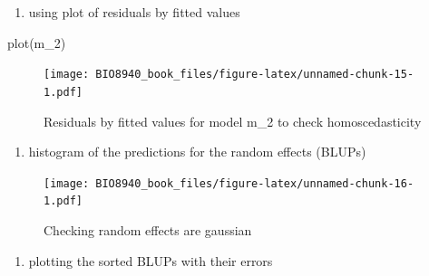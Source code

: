 \documentclass[
  12pt,
]{book}
\newenvironment{Shaded}{\begin{snugshade}}{\end{snugshade}}
\newcommand{\AttributeTok}[1]{\textcolor[rgb]{0.77,0.63,0.00}{#1}}
\newcommand{\CommentTok}[1]{\textcolor[rgb]{0.56,0.35,0.01}{\textit{#1}}}
\newcommand{\ConstantTok}[1]{\textcolor[rgb]{0.00,0.00,0.00}{#1}}
\newcommand{\DecValTok}[1]{\textcolor[rgb]{0.00,0.00,0.81}{#1}}
\newcommand{\FunctionTok}[1]{\textcolor[rgb]{0.00,0.00,0.00}{#1}}
\newcommand{\NormalTok}[1]{#1}
\newcommand{\OtherTok}[1]{\textcolor[rgb]{0.56,0.35,0.01}{#1}}
\newcommand{\SpecialCharTok}[1]{\textcolor[rgb]{0.00,0.00,0.00}{#1}}
\providecommand{\tightlist}{%
  \setlength{\itemsep}{0pt}\setlength{\parskip}{0pt}}
\begin{document}
\begin{enumerate}
\def\labelenumi{\arabic{enumi}.}
\setcounter{enumi}{3}
\tightlist
\item
  using plot of residuals by fitted values
\end{enumerate}

\begin{Shaded}
\begin{Highlighting}[]
\FunctionTok{plot}\NormalTok{(m\_2)}
\end{Highlighting}
\end{Shaded}

\begin{figure}
\centering
\texttt{[image: BIO8940\_book\_files/figure-latex/unnamed-chunk-15-1.pdf]}
\caption{\label{fig:unnamed-chunk-15}Residuals by fitted values for model m\_2 to check homoscedasticity}
\end{figure}

\begin{enumerate}
\def\labelenumi{\arabic{enumi}.}
\setcounter{enumi}{4}
\tightlist
\item
  histogram of the predictions for the random effects (BLUPs)
\end{enumerate}

\begin{Shaded}
\end{Shaded}

\begin{figure}
\centering
\texttt{[image: BIO8940\_book\_files/figure-latex/unnamed-chunk-16-1.pdf]}
\caption{\label{fig:unnamed-chunk-16}Checking random effects are gaussian}
\end{figure}

\begin{enumerate}
\def\labelenumi{\arabic{enumi}.}
\setcounter{enumi}{5}
\tightlist
\item
  plotting the sorted BLUPs with their errors
\end{enumerate}
\end{document}

